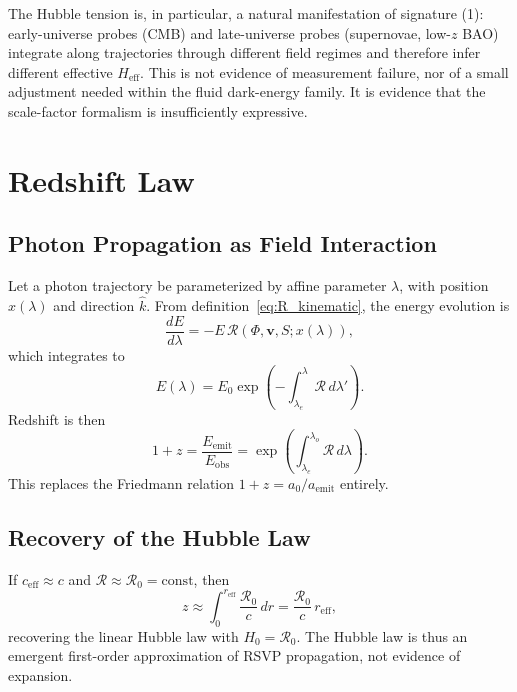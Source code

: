 \documentclass[12pt,a4paper]{article}
\theoremstyle{remark}
\newcommand{\vv}{\mathbf{v}}
\newcommand{\Rcal}{\mathcal{R}}
\newcommand{\reff}{r_{\mathrm{eff}}}
\newcommand{\Heff}{H_{\mathrm{eff}}}
\newcommand{\ceff}{c_{\mathrm{eff}}}
\begin{document}
The Hubble tension is, in particular, a natural manifestation of signature (1): early-universe probes (CMB) and late-universe probes (supernovae, low-$z$ BAO) integrate along trajectories through different field regimes and therefore infer different effective $\Heff$. This is not evidence of measurement failure, nor of a small adjustment needed within the fluid dark-energy family. It is evidence that the scale-factor formalism is insufficiently expressive.

\section{Redshift Law}
\label{sec:redshift}

\subsection{Photon Propagation as Field Interaction}

Let a photon trajectory be parameterized by affine parameter $\lambda$, with position $x(\lambda)$ and direction $\hat{k}$. From definition~\eqref{eq:R_kinematic}, the energy evolution is
\begin{equation}
\frac{dE}{d\lambda} = -E\,\Rcal(\Phi, \vv, S; x(\lambda)),
\end{equation}
which integrates to
\begin{equation}
E(\lambda) = E_0 \exp\!\left(-\int_{\lambda_e}^{\lambda}\Rcal\, d\lambda'\right).
\end{equation}
Redshift is then
\begin{equation}
1 + z = \frac{E_{\mathrm{emit}}}{E_{\mathrm{obs}}} = \exp\!\left(\int_{\lambda_e}^{\lambda_o}\Rcal\, d\lambda\right).
\end{equation}
This replaces the Friedmann relation $1+z = a_0/a_{\mathrm{emit}}$ entirely.

\subsection{Recovery of the Hubble Law}

If $\ceff \approx c$ and $\Rcal \approx \Rcal_0 = \mathrm{const}$, then
\begin{equation}
z \approx \int_0^{\reff} \frac{\Rcal_0}{c}\, dr = \frac{\Rcal_0}{c}\,\reff,
\end{equation}
recovering the linear Hubble law with $H_0 = \Rcal_0$. The Hubble law is thus an emergent first-order approximation of RSVP propagation, not evidence of expansion.
\end{document}
